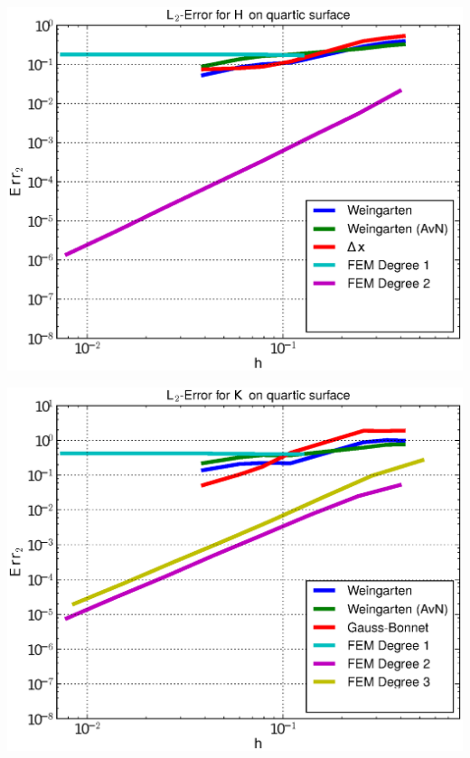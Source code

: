 \documentclass[handout]{beamer}
\begin{document}
\begin{frame}
\begin{overprint}
\begin{minipage}[t]{0.49\textwidth}
            \centering\includegraphics[width=\textwidth]{bilder/Curvature/heineB/ErrHL2_5.eps}
          \end{minipage}
          \begin{minipage}[t]{0.49\textwidth}
            \centering\includegraphics[width=\textwidth]{bilder/Curvature/heineB/ErrKL2_6.eps}
          \end{minipage}\hfill
          \begin{minipage}[t]{0.49\textwidth}

\end{minipage}
\end{overprint}
\end{frame}
\end{document}
